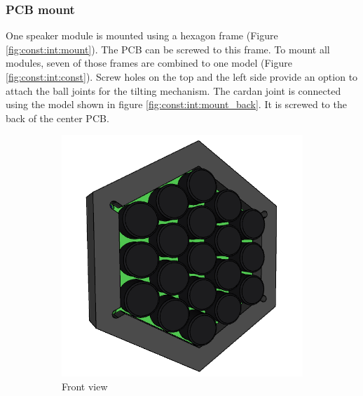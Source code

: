 \subsubsection*{PCB mount}
%
One speaker module is mounted using a hexagon frame (Figure \ref{fig:const:int:mount}). The PCB can be screwed to this frame. To mount all modules, seven of those frames are combined to one model (Figure \ref{fig:const:int:const}). Screw holes on the top and the left side provide an option to attach the ball joints for the tilting mechanism. The cardan joint is connected using the model shown in figure \ref{fig:const:int:mount_back}. It is screwed to the back of the center PCB.
%
\begin{figure}[ht]
  \begin{subfigure}[b]{0.49\textwidth}
    \includegraphics[width=\textwidth]{src/assets/pictures/construction/pcb_plate.png}
    \caption{Front view}
    \label{fig:const:int:mount_front}
  \end{subfigure}
  \hfill
  \begin{subfigure}[b]{0.49\textwidth}

\end{subfigure}
\end{figure}
